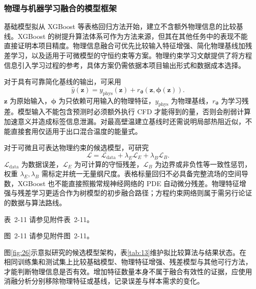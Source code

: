 \documentclass[UTF8]{midterm}
\makeatletter
\newcommand{\submissionnumber}[1]{\def\@currentlabel{#1}}
\makeatother
\begin{document}
\subsubsection{物理与机器学习融合的模型框架}
基础模型拟从 XGBoost 等表格回归方法开始，建立不含额外物理信息的比较基线。XGBoost 的树提升算法体系可作为方法来源\cite{chen2016}，但其在其他任务中的表现不能直接证明本项目精度。物理信息融合可优先比较输入特征增强、简化物理基线加残差学习，以及适用于可微模型的守恒约束等方案。物理约束学习文献提供了将方程信息引入学习过程的参考\cite{raissi2017}，具体方案仍需依据本项目输出形式和数据成本选择。

对于具有可靠简化基线的输出，可采用
\begin{equation}
\widehat y(\bm z)=y_{\mathrm{phys}}(\bm z)+r_{\boldsymbol\vartheta}(\bm z,\bm\phi(\bm z)).\label{eq:residualmodel}
\end{equation}
$\bm z$ 为原始输入，$\bm\phi$ 为只依赖可用输入的物理特征，$y_{\mathrm{phys}}$ 为物理基线，$r_{\boldsymbol\vartheta}$ 为学习残差。模型输入不能包含预测时必须额外执行 CFD 才能得到的量，否则会削弱计算加速意义并造成标签信息泄漏。对最高壁温建立基线时还需说明局部热阻近似，不能直接套用仅适用于出口混合温度的能量式。

对于可微且可表达物理约束的候选模型，可研究
\begin{equation}
\mathcal L=\mathcal L_{\mathrm{data}}+\lambda_E\mathcal L_E+\lambda_B\mathcal L_B.\label{eq:loss}
\end{equation}
$\mathcal L_{\mathrm{data}}$ 为数据误差，$\mathcal L_E$ 为可计算的守恒残差，$\mathcal L_B$ 为边界或非负性等一致性惩罚，权重 $\lambda_E,\lambda_B$ 需标定并统一无量纲尺度。表格标量回归不必具备完整流场的空间导数，XGBoost 也不能直接照搬常规神经网络的 PDE 自动微分残差。物理特征增强与残差学习更适合作为树模型的初步融合路径；方程约束网络则属于需另行论证的数据与算法路线。

\par\noindent \begingroup\submissionnumber{2-11}\label{tab:13}\endgroup 表~2-11 请参见附件表~2-11。\par



\par\noindent \begingroup\submissionnumber{2-11}\label{fig:26}\endgroup 图~2-11 请参见附件图~2-11。\par

图\ref{fig:26}示意拟研究的候选模型架构，表\ref{tab:13}维护拟比较算法与结果状态。在相同训练集和测试集上比较基础模型、物理特征增强、残差模型与其他可行方法，才能判断物理信息是否有效。增加特征数量本身不属于融合有效性的证据，应使用消融分析分别移除物理特征或基线，记录误差与样本需求的变化。
\end{document}
